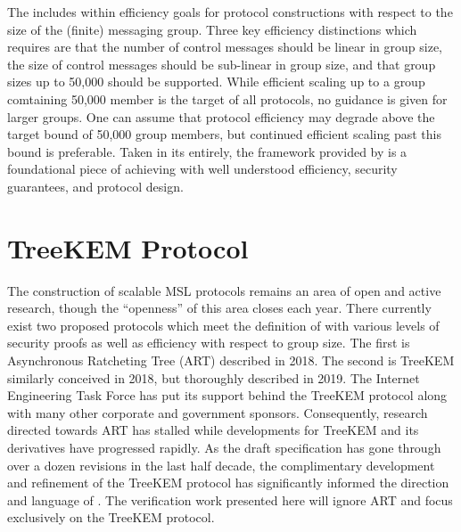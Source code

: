 The  includes within  efficiency goals \autocite{ietf-mls-architecture-07} for protocol constructions with respect to the size of the (finite) messaging group.
Three key efficiency distinctions which  requires are that the number of control messages should be linear in group size, the size of control messages should be sub-linear in group size, and that group sizes up to 50,000 should be supported.
While efficient scaling up to a group comtaining 50,000 member is the target of all  protocols, no guidance is given for larger groups.
One can assume that protocol efficiency may degrade above the target bound of 50,000 group members, but continued efficient scaling past this bound is preferable.
Taken in its entirely, the framework provided by  is a foundational piece of achieving  with well understood efficiency, security guarantees, and protocol design.


\hypertarget{sec:treekem-protocol}{%
\section{TreeKEM Protocol}\label{sec:treekem-protocol}}

The construction of scalable MSL protocols remains an area of open and active research, though the ``openness'' of this area closes each year.
There currently exist two proposed protocols which meet the definition of  with various levels of security proofs as well as efficiency with respect to group size.
The first is Asynchronous Ratcheting Tree (ART) \autocite{cohn2018ends} described in 2018.
The second is TreeKEM \autocite{bhargavan:hal-02425247} similarly conceived in 2018, but thoroughly described in 2019.
The Internet Engineering Task Force has put its support behind the TreeKEM protocol along with many other corporate and government sponsors.
Consequently, research directed towards ART has stalled while developments for TreeKEM and its derivatives have progressed rapidly.
As the  draft specification has gone through over a dozen revisions in the last half decade, the complimentary development and refinement of the TreeKEM protocol has significantly informed the direction and language of .
The verification work presented here will ignore ART and focus exclusively on the TreeKEM protocol.

